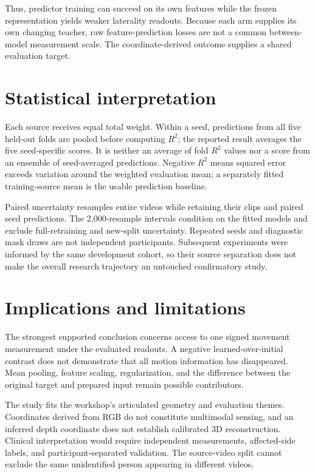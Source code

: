 \documentclass{article}
\begin{document}
Thus, predictor training can succeed on its own features while the frozen representation yields weaker laterality readouts. Because each arm supplies its own changing teacher, raw feature-prediction losses are not a common between-model measurement scale. The coordinate-derived outcome supplies a shared evaluation target.

\section{Statistical interpretation}\label{statistical-interpretation}

Each source receives equal total weight. Within a seed, predictions from all five held-out folds are pooled before computing \(R^2\); the reported result averages the five seed-specific scores. It is neither an average of fold \(R^2\) values nor a score from an ensemble of seed-averaged predictions. Negative \(R^2\) means squared error exceeds variation around the weighted evaluation mean; a separately fitted training-source mean is the usable prediction baseline.

Paired uncertainty resamples entire videos while retaining their clips and paired seed predictions. The 2,000-resample intervals condition on the fitted models and exclude full-retraining and new-split uncertainty. Repeated seeds and diagnostic mask draws are not independent participants. Subsequent experiments were informed by the same development cohort, so their source separation does not make the overall research trajectory an untouched confirmatory study.

\section{Implications and limitations}\label{implications-and-limitations}

The strongest supported conclusion concerns access to one signed movement measurement under the evaluated readouts. A negative learned-over-initial contrast does not demonstrate that all motion information has disappeared. Mean pooling, feature scaling, regularization, and the difference between the original target and prepared input remain possible contributors.

The study fits the workshop's articulated geometry and evaluation themes. Coordinates derived from RGB do not constitute multimodal sensing, and an inferred depth coordinate does not establish calibrated 3D reconstruction. Clinical interpretation would require independent measurements, affected-side labels, and participant-separated validation. The source-video split cannot exclude the same unidentified person appearing in different videos.
\end{document}
